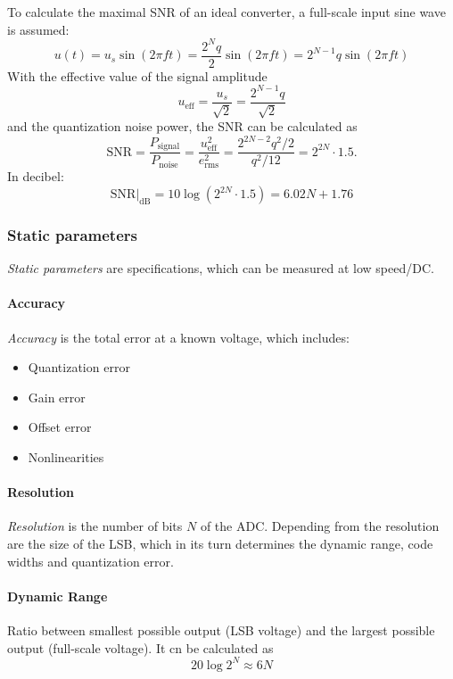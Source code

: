 To calculate the maximal SNR of an ideal converter, a full-scale input sine wave is assumed:
\begin{equation}
u(t) = u_s \sin(2\pi f t) = \frac{2^{N}q}{2}\sin(2\pi f t)  = 2^{N-1}q \sin(2\pi f t)
\end{equation}
With the effective value of the signal amplitude
\begin{equation}
u_{\text{eff}} = \frac{u_s}{\sqrt{2}} = \frac{2^{N-1}q}{\sqrt{2}}
\end{equation}
and the quantization noise power, the SNR can be calculated as
\begin{equation}
\text{SNR} = \frac{P_{\text{signal}}}{P_{\text{noise}}} = \frac{u_{\text{eff}}^{2}}{e_{\text{rms}}^{2}} = \frac{2^{2N-2}q^2/2}{q^2/12} = 2^{2N} \cdot 1.5.
\end{equation}
In decibel:
\begin{equation}
\text{SNR}|_{\text{dB}} = 10\log\left(2^{2N}\cdot 1.5\right) = 6.02 N + 1.76
\end{equation}
\cite{puente2015} \cite{walt}


\subsubsection{Static parameters}
\textit{Static parameters} are specifications, which can be measured at low speed/DC. 
\paragraph{Accuracy}
\textit{Accuracy} is the total error at a known voltage, which includes:
\begin{itemize}[noitemsep]
	\item Quantization error
	\item Gain error
	\item Offset error
	\item Nonlinearities
\end{itemize}

\paragraph{Resolution}
\textit{Resolution} is the number of bits $N$ of the ADC. Depending from the resolution are the size of the LSB, which in its turn determines the dynamic range, code widths and quantization error.

\paragraph{Dynamic Range}
Ratio between smallest possible output (LSB voltage) and the largest possible output (full-scale voltage). It cn be calculated as
\begin{equation}
	20 \log 2^{N} \approx 6N
\end{equation}



